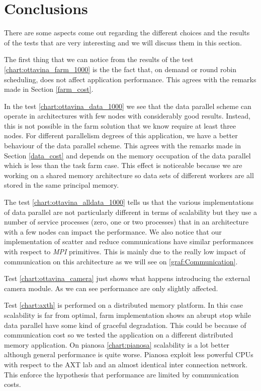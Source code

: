 \section{Conclusions}

There are some aspects come out regarding the different choices and the results of the tests that are very interesting and we will discuss them in this section.

The first thing that we can notice from the results of the test \ref{chart:ottavina_farm_1000} is the the fact that, on demand or round robin scheduling, does not affect application performance.
This agrees with the remarks made in Section \ref{farm_cost}.

In the test \ref{chart:ottavina_data_1000} we see that the data parallel scheme can operate in architectures with few nodes with considerably good results.
Instead, this is not possible in the farm solution that we know require at least three nodes. 
For different parallelism degrees of this application, we have a better behaviour of the data parallel scheme. 
This agrees with the remarks made in Section \ref{data_cost} and depends on the memory occupation of the data parallel which is less than the task farm case. 
This effect is noticeable because we are working on a shared memory architecture so data sets of different workers are all stored in the same principal memory.

The test \ref{chart:ottavina_alldata_1000} tells us that the various implementations of data parallel are not particularly different in terms of scalability but they use a number of service processes (zero, one or two processes) that in an architecture with a few nodes can impact the performance.
We also notice that our implementation of scatter and reduce communications have similar performances with respect to \textit{MPI} primitives.
This is mainly due to the really low impact of communication on this architecture as we will see on \ref{graf:Communication}.

Test \ref{chart:ottavina_camera} just shows what happens introducing the external camera module. 
As we can see performance are only slightly affected.

Test \ref{chart:axth} is performed on a distributed memory platform. 
In this case scalability is far from optimal, farm implementation shows an abrupt stop while data parallel have some kind of graceful degradation.
This could be because of communication cost so we tested the application on a different distributed memory application.
On pianosa \ref{chart:pianosa} scalability is a lot better although general performance is quite worse.
Pianosa exploit less powerful CPUs with respect to the AXT lab and an almost identical inter connection network.
This enforce the hypothesis that performance are limited by communication costs.

